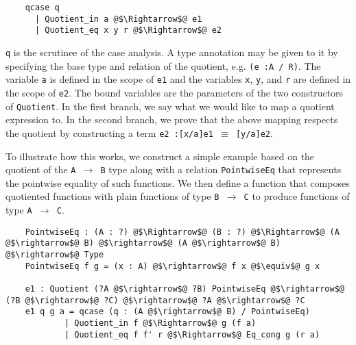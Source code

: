 \documentclass[12pt,twoside,maitrise]{dms}
\theoremstyle{definition}
\numberwithin{equation}{section}
\numberwithin{table}{chapter}
\numberwithin{figure}{chapter}
\newcommand\id[1] {\texttt{#1}}
\newcommand\fn[1] {\texttt{#1}}
\begin{document}
\begin{verbatim}
    qcase q
      | Quotient_in a @$\Rightarrow$@ e1
      | Quotient_eq x y r @$\Rightarrow$@ e2
\end{verbatim}

\id{q} is the scrutinee of the case analysis. A type annotation may be given to it
by specifying the base type and relation of the quotient, e.g. \fn{(e :\@ A / R)}.
The variable \id{a} is defined in the scope of \id{e1} and the variables \id{x},
\id{y}, and \id{r} are defined in the scope of \id{e2}. The bound variables are
the parameters of the two constructors of \id{Quotient}. In the first branch, we
say what we would like to map a quotient expression to. In the second branch, we
prove that the above mapping respects the quotient by constructing a term
\fn{e2 :\@ [x/a]e1 $\equiv$ [y/a]e2}.

To illustrate how this works, we construct a simple example based on the
quotient of the \id{A $\rightarrow$ B} type along with a relation
\id{PointwiseEq} that represents the pointwise equality of such functions. We
then define a function that composes quotiented functions with plain functions
of type \id{B $\rightarrow$ C} to produce functions of type \id{A $\rightarrow$
  C}.



\begin{verbatim}
    PointwiseEq : (A : ?) @$\Rightarrow$@ (B : ?) @$\Rightarrow$@ (A @$\rightarrow$@ B) @$\rightarrow$@ (A @$\rightarrow$@ B) @$\rightarrow$@ Type
    PointwiseEq f g = (x : A) @$\rightarrow$@ f x @$\equiv$@ g x

    e1 : Quotient (?A @$\rightarrow$@ ?B) PointwiseEq @$\rightarrow$@ (?B @$\rightarrow$@ ?C) @$\rightarrow$@ ?A @$\rightarrow$@ ?C
    e1 q g a = qcase (q : (A @$\rightarrow$@ B) / PointwiseEq)
            | Quotient_in f @$\Rightarrow$@ g (f a)
            | Quotient_eq f f' r @$\Rightarrow$@ Eq_cong g (r a)
\end{verbatim}
\end{document}
